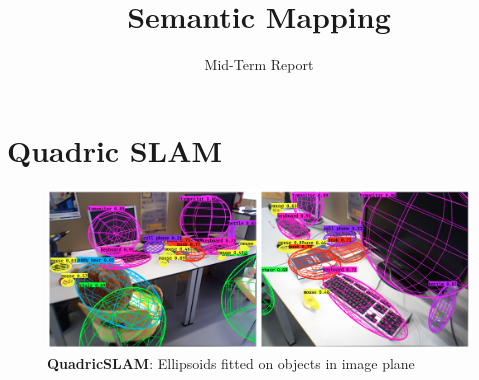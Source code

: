 \documentclass{article}
\title{Semantic Mapping}
\author{Mid-Term Report}
\date{}
\begin{document}
\maketitle









\section{Quadric SLAM}

\begin{figure}[H]
\centering
\includegraphics[width=\textwidth, height=0.3\textheight] {Images/Quadric_slam.png}
\caption{\centering\textbf{QuadricSLAM}: Ellipsoids fitted on objects in image plane\cite{quadric2}}
\label{fig:QuadricSLAM}
\end{figure}
    
\end{document}
